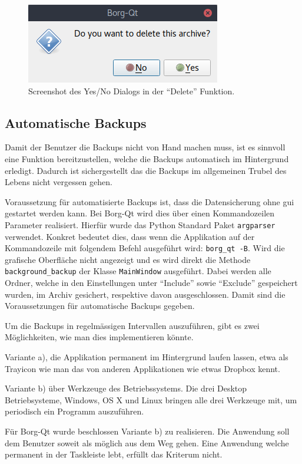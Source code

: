 \begin{figure}[H]
\centering
\includegraphics[width=.3\paperwidth]{pictures/borgqt_yes_no.png}
\caption{\label{fig:orgf3d4105}
Screenshot des Yes/No Dialogs in der "`Delete"' Funktion.}
\end{figure}
\newpage
\subsection{Automatische Backups}
\label{sec:org99bb44c}

Damit der Benutzer die Backups nicht von Hand machen muss, ist es sinnvoll eine
Funktion bereitzustellen, welche die Backups automatisch im Hintergrund
erledigt. Dadurch ist sichergestellt das die Backups im allgemeinen Trubel des
Lebens nicht vergessen gehen.

Voraussetzung für automatisierte Backups ist, dass die Datensicherung ohne
\gls{gui} gestartet werden kann. Bei Borg-Qt wird dies über einen Kommandozeilen
Parameter realisiert. Hierfür wurde das Python Standard Paket \texttt{argparser}
verwendet. Konkret bedeutet dies, dass wenn die Applikation auf der
Kommandozeile mit folgendem Befehl ausgeführt wird: \texttt{borg\_qt -B}. Wird die
grafische Oberfläche nicht angezeigt und es wird direkt die Methode
\texttt{background\_backup} der Klasse \texttt{MainWindow} ausgeführt. Dabei werden alle
Ordner, welche in den Einstellungen unter "`Include"' sowie "`Exclude"' gespeichert
wurden, im Archiv gesichert, respektive davon ausgeschlossen. Damit sind die
Voraussetzungen für automatische Backups gegeben.

Um die Backups in regelmässigen Intervallen auszuführen, gibt es zwei
Möglichkeiten, wie man dies implementieren könnte.

Variante a), die Applikation permanent im Hintergrund laufen lassen, etwa als
Trayicon wie man das von anderen Applikationen wie etwas Dropbox kennt.

Variante b) über Werkzeuge des Betriebssystems. Die drei Desktop
Betriebsysteme, Windows, OS X und Linux bringen alle drei Werkzeuge mit, um
periodisch ein Programm auszuführen.

Für Borg-Qt wurde beschlossen Variante b) zu realisieren. Die Anwendung soll
dem Benutzer soweit als möglich aus dem Weg gehen. Eine Anwendung welche
permanent in der Taskleiste lebt, erfüllt das Kriterum nicht.

